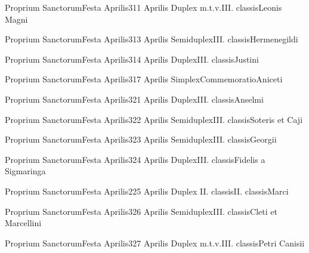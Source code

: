 \documentclass[psalterium-feriale.tex]{subfiles}
\begin{document}
	{Proprium Sanctorum}{Festa Aprilis}{3}{11 Aprilis}
	{Duplex m.t.v.}{III. classis}{Leonis Magni}
	{}
	{}
\COPOcdRubric

	{Proprium Sanctorum}{Festa Aprilis}{3}{13 Aprilis}
	{Semiduplex}{III. classis}{Hermenegildi}
	{}
	{}


	{Proprium Sanctorum}{Festa Aprilis}{3}{14 Aprilis}
	{Duplex}{III. classis}{Justini}
	{}
	{}
\UMEXbdRubric

	{Proprium Sanctorum}{Festa Aprilis}{3}{17 Aprilis}
	{Simplex}{Commemoratio}{Aniceti}
	{}
	{}
\UMEXadRubric

	{Proprium Sanctorum}{Festa Aprilis}{3}{21 Aprilis}
	{Duplex}{III. classis}{Anselmi}
	{}
	{}
\COPOdRubric

	{Proprium Sanctorum}{Festa Aprilis}{3}{22 Aprilis}
	{Semiduplex}{III. classis}{Soteris et Caji}
	{}
	{}
\PMTPRubric

	{Proprium Sanctorum}{Festa Aprilis}{3}{23 Aprilis}
	{Semiduplex}{III. classis}{Georgii}
	{}
	{}
\UMTPRubric

	{Proprium Sanctorum}{Festa Aprilis}{3}{24 Aprilis}
	{Duplex}{III. classis}{Fidelis a Sigmaringa}
	{}
	{}
\UMTPRubric

	{Proprium Sanctorum}{Festa Aprilis}{2}{25 Aprilis}
	{Duplex II. classis}{II. classis}{Marci}
	{}
	{}
\psalmodiapropria

	{Proprium Sanctorum}{Festa Aprilis}{3}{26 Aprilis}
	{Semiduplex}{III. classis}{Cleti et Marcellini}
	{}
	{}
\PMTPRubric

	{Proprium Sanctorum}{Festa Aprilis}{3}{27 Aprilis}
	{Duplex m.t.v.}{III. classis}{Petri Canisii}
	{}
	{}
\COPOdRubric
\end{document}

